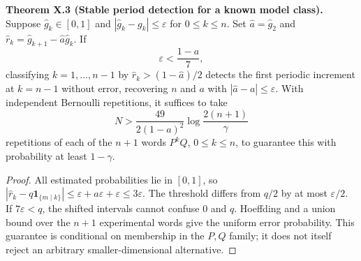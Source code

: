 \documentclass[11pt,a4paper,oneside]{book}
\newcommand{\one}{\mathbf 1}\newcommand{\ii}{\mathrm i}\newcommand{\dd}{\mathrm d}
\newcommand{\statement}[3]{\par\medskip\noindent\textbf{#1 #2 (#3).}\ }
\begin{document}
\statement{Theorem}{X.3}{Stable period detection for a known model class} Suppose $\widehat g_k\in[0,1]$ and $|\widehat g_k-g_k|\le\varepsilon$ for $0\le k\le n$. Set $\widehat a=\widehat g_2$ and $\widehat r_k=\widehat g_{k+1}-\widehat a\widehat g_k$. If
\begin{equation}\varepsilon<\frac{1-a}{7},\tag{49}\end{equation}
classifying $k=1,\ldots,n-1$ by $\widehat r_k>(1-\widehat a)/2$ detects the first periodic increment at $k=n-1$ without error, recovering $n$ and $a$ with $|\widehat a-a|\le\varepsilon$. With independent Bernoulli repetitions, it suffices to take
\[N>\frac{49}{2(1-a)^2}\log\frac{2(n+1)}\gamma\]
repetitions of each of the $n+1$ words $P^kQ$, $0\le k\le n$, to guarantee this with probability at least $1-\gamma$.
\begin{proof}All estimated probabilities lie in $[0,1]$, so $|\widehat r_k-q\one_{\{m\mid k\}}|\le\varepsilon+a\varepsilon+\varepsilon\le3\varepsilon$. The threshold differs from $q/2$ by at most $\varepsilon/2$. If $7\varepsilon<q$, the shifted intervals cannot confuse 0 and $q$. Hoeffding and a union bound over the $n+1$ experimental words give the uniform error probability. This guarantee is conditional on membership in the $P,Q$ family; it does not itself reject an arbitrary smaller-dimensional alternative.\end{proof}
\end{document}
